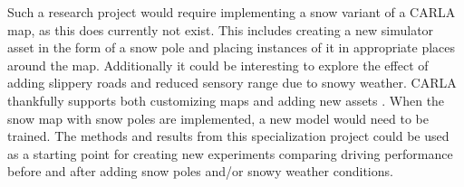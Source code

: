 Such a research project would require implementing a snow variant of a CARLA map, as this does currently not exist. This includes creating a new simulator asset in the form of a snow pole and placing instances of it in appropriate places around the map. Additionally it could be interesting to explore the effect of adding slippery roads and reduced sensory range due to snowy weather. CARLA thankfully supports both customizing maps and adding new assets \cite{carla-custom-maps, carla-custom-props}. When the snow map with snow poles are implemented, a new model would need to be trained. The methods and results from this specialization project could be used as a starting point for creating new experiments comparing driving performance before and after adding snow poles and/or snowy weather conditions. %


